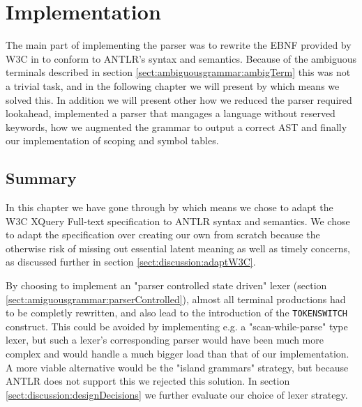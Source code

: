 \chapter{Implementation}
\label{chapter:implementation}

The main part of implementing the parser was to rewrite the EBNF provided by W3C in \cite{w3c01} to conform to ANTLR's syntax and semantics. Because of the ambiguous terminals described in section \ref{sect:ambiguousgrammar:ambigTerm} this was not a trivial task, and in the following chapter we will present by which means we solved this. In addition we will present other how we reduced the parser required lookahead, implemented a parser that mangages a language without reserved keywords, how we augmented the grammar to output a correct AST and finally our implementation of scoping and symbol tables.















\section{Summary}
In this chapter we have gone through by which means we chose to adapt the W3C
XQuery Full-text specification to ANTLR syntax and semantics. We chose to adapt
the specification over creating our own from scratch because the otherwise risk
of missing out essential latent meaning as well as timely concerns, as
discussed further in section \ref{sect:discussion:adaptW3C}.    

By choosing to implement an "parser controlled state driven" lexer (section
\ref{sect:amiguousgrammar:parserControlled}), almost all terminal productions
had to be completly rewritten, and also lead to the introduction of the
\verb!TOKENSWITCH! construct. This could be avoided by implementing e.g. a
"scan-while-parse" type lexer, but such a lexer's corresponding parser would
have been much more complex and would handle a much bigger load than that of
our implementation. A more viable alternative would be the "island grammars"
strategy, but because ANTLR does not support this we rejected this solution. In
section \ref{sect:discussion:designDecisions} we further evaluate our choice of
lexer strategy.         

